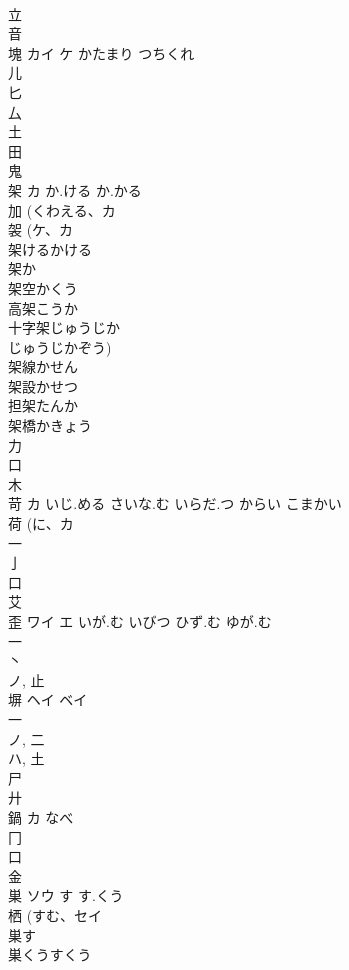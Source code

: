\documentclass[8pt]{extreport}
\begin{document}
\begin{CJK}{UTF8}{min}
\\	立 
\\	音 
\\	塊	カイ ケ	かたまり つちくれ	
\\	儿 
\\	匕 
\\	厶 
\\	土 
\\	田 
\\	鬼 
\\	架	カ	か.ける か.かる	
\\	加 (くわえる、カ 
\\	袈 (ケ、カ 
\\	架けるかける
\\	架か
\\	架空かくう
\\	高架こうか
\\	十字架じゅうじか
\\	じゅうじかぞう)
\\	架線かせん
\\	架設かせつ
\\	担架たんか
\\	架橋かきょう
\\	力 
\\	口 
\\	木 
\\	苛	カ	いじ.める さいな.む いらだ.つ からい こまかい	
\\	荷 (に、カ 
\\	一 
\\	亅 
\\	口 
\\	艾 
\\	歪	ワイ エ	いが.む いびつ ひず.む ゆが.む	
\\	一 
\\	丶 
\\	ノ, 止 
\\	塀	ヘイ ベイ		
\\	一 
\\	ノ, 二 
\\	ハ, 土 
\\	尸 
\\	廾 
\\	鍋	カ	なべ	
\\	冂 
\\	口 
\\	金 
\\	巣	ソウ	す す.くう	
\\	栖 (すむ、セイ 
\\	巣す
\\	巣くうすくう

\end{CJK}
\end{document}
